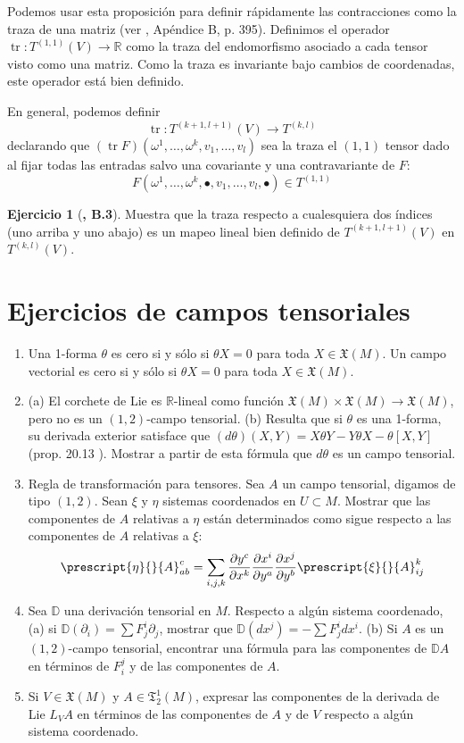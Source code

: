 \documentclass[spanish]{book}
\theoremstyle{definition}
\newtheorem*{ejer*}{Ejercicio}
\newcommand{\R}{\mathbb{R}}
\newcommand{\D}{\mathbb{D}}
\newcommand{\X}{\mathfrak{X}}
\newcommand{\T}{\mathfrak{T}}
\begin{document}
	\label{traza}
	Podemos usar esta proposición para definir rápidamente las contracciones como la traza de una matriz (ver \cite{Lee-riem}, Apéndice B, p. 395). Definimos el operador $\operatorname{tr}:T^{(1,1)}(V)\to\R$ como la traza del endomorfismo asociado a cada tensor visto como una matriz. Como la traza es invariante bajo cambios de coordenadas, este operador está bien definido.
	
	En general, podemos definir
	\[\operatorname{tr}:T^{(k+1,l+1)}(V)\to T^{(k,l)}\]
	declarando que $(\operatorname{tr}F)(\omega^1,\ldots,\omega^k,v_1,\ldots,v_l)$ sea la traza el $(1,1)$ tensor dado al fijar todas las entradas salvo una covariante y una contravariante de $F$:
	\[F(\omega^1,\ldots,\omega^k,\bullet,v_1,\ldots,v_l,\bullet)\in T^{(1,1)}\]
	
	\begin{ejer*}[\cite{Lee-riem}\textbf{, B.3}]
		Muestra que la traza respecto a cualesquiera dos índices (uno arriba y uno abajo) es un mapeo lineal bien definido de $T^{(k+1,l+1)}(V)$ en $T^{(k,l)}(V)$.
	\end{ejer*}
	\section{Ejercicios de campos tensoriales}
	\begin{enumerate}
		\item Una 1-forma $\theta$ es cero si y sólo si $\theta X=0$ para toda $X\in\X(M)$. Un campo vectorial es cero si y sólo si $\theta X=0$ para toda $X\in\X(M)$.
		
		\item (a) El corchete de Lie es $\R$-lineal como función $\X(M)\times\X(M)\to\X(M)$, pero no es un $(1,2)$-campo tensorial. (b) Resulta que si $\theta$ es una 1-forma, su derivada exterior satisface que $(d\theta)(X,Y)=X\theta Y-Y\theta X-\theta[X,Y]$ (prop. 20.13 \cite{Loring}). Mostrar a partir de esta fórmula que $d\theta$ es un campo tensorial.
		
		\item Regla de transformación para tensores. Sea $A$ un campo tensorial, digamos de tipo $(1,2)$. Sean $\xi$ y $\eta$ sistemas coordenados en $U\subset M$. Mostrar que las componentes de $A$ relativas a $\eta$ están determinados como sigue respecto a las componentes de $A$ relativas a $\xi$:
		\[\prescript{\eta}{}{A}^c_{ab}=\sum_{i,j,k}\frac{\partial y^c}{\partial x^k}\frac{\partial x^i}{\partial y^a}\frac{\partial x^j}{\partial y^b}\prescript{\xi}{}{A}^k_{ij}\]
		
		\item Sea $\D$ una derivación tensorial en $M$. Respecto a algún sistema coordenado, (a) si $\D(\partial_i)=\sum F^i_j\partial_j$, mostrar que $\D(dx^j)=-\sum F^i_jdx^i$. (b) Si $A$ es un $(1,2)$-campo tensorial, encontrar una fórmula para las componentes de $\D A$ en términos de $F^j_i$ y de las componentes de $A$.
		
		\item Si $V\in\X(M)$ y $A\in\T^1_2(M)$, expresar las componentes de la derivada de Lie $L_VA$ en términos de las componentes de $A$ y de $V$ respecto a algún sistema coordenado.
	\end{enumerate}
	
\end{document}
